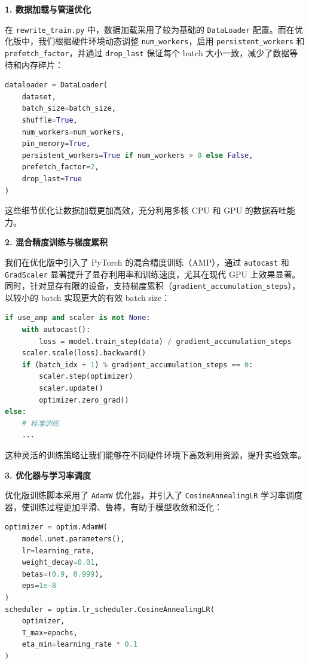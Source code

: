 \documentclass{ctexart}
\begin{document}
\vspace{0.5em}
\noindent
\textbf{1. 数据加载与管道优化}

\noindent
在 \texttt{rewrite\_train.py} 中，数据加载采用了较为基础的 \texttt{DataLoader} 配置。而在优化版中，我们根据硬件环境动态调整 \texttt{num\_workers}，启用 \texttt{persistent\_workers} 和 \texttt{prefetch\_factor}，并通过 \texttt{drop\_last} 保证每个 batch 大小一致，减少了数据等待和内存碎片：

\begin{lstlisting}[language=python]
dataloader = DataLoader(
    dataset,
    batch_size=batch_size,
    shuffle=True,
    num_workers=num_workers,
    pin_memory=True,
    persistent_workers=True if num_workers > 0 else False,
    prefetch_factor=2,
    drop_last=True
)
\end{lstlisting}

\noindent
这些细节优化让数据加载更加高效，充分利用多核 CPU 和 GPU 的数据吞吐能力。

\vspace{0.5em}
\noindent
\textbf{2. 混合精度训练与梯度累积}

\noindent
我们在优化版中引入了 PyTorch 的混合精度训练（AMP），通过 \texttt{autocast} 和 \texttt{GradScaler} 显著提升了显存利用率和训练速度，尤其在现代 GPU 上效果显著。同时，针对显存有限的设备，支持梯度累积（\texttt{gradient\_accumulation\_steps}），以较小的 batch 实现更大的有效 batch size：

\begin{lstlisting}[language=python]
if use_amp and scaler is not None:
    with autocast():
        loss = model.train_step(data) / gradient_accumulation_steps
    scaler.scale(loss).backward()
    if (batch_idx + 1) % gradient_accumulation_steps == 0:
        scaler.step(optimizer)
        scaler.update()
        optimizer.zero_grad()
else:
    # 标准训练
    ...
\end{lstlisting}

这种灵活的训练策略让我们能够在不同硬件环境下高效利用资源，提升实验效率。

\vspace{0.5em}
\noindent
\textbf{3. 优化器与学习率调度}

\noindent
优化版训练脚本采用了 \texttt{AdamW} 优化器，并引入了 \texttt{CosineAnnealingLR} 学习率调度器，使训练过程更加平滑、鲁棒，有助于模型收敛和泛化：

\begin{lstlisting}[language=python]
optimizer = optim.AdamW(
    model.unet.parameters(), 
    lr=learning_rate,
    weight_decay=0.01,
    betas=(0.9, 0.999),
    eps=1e-8
)
scheduler = optim.lr_scheduler.CosineAnnealingLR(
    optimizer, 
    T_max=epochs,
    eta_min=learning_rate * 0.1
)
\end{lstlisting}
\end{document}
